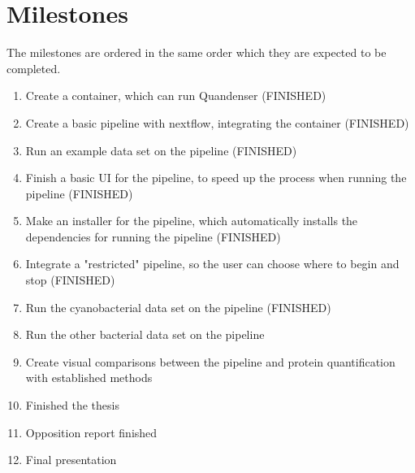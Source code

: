 \section{Milestones}

The milestones are ordered in the same order which they are expected to be completed.

\begin{enumerate}
\item Create a container, which can run Quandenser (FINISHED)
\item Create a basic pipeline with nextflow, integrating the container (FINISHED)
\item Run an example data set on the pipeline (FINISHED)
\item Finish a basic UI for the pipeline, to speed up the process when running the pipeline (FINISHED)
\item Make an installer for the pipeline, which automatically installs the dependencies for running the pipeline (FINISHED)
\item Integrate a "restricted" pipeline, so the user can choose where to begin and stop (FINISHED)
\item Run the cyanobacterial data set on the pipeline (FINISHED)
\item Run the other bacterial data set on the pipeline
\item Create visual comparisons between the pipeline and protein quantification with established methods
\item Finished the thesis
\item Opposition report finished
\item Final presentation
\end{enumerate}
